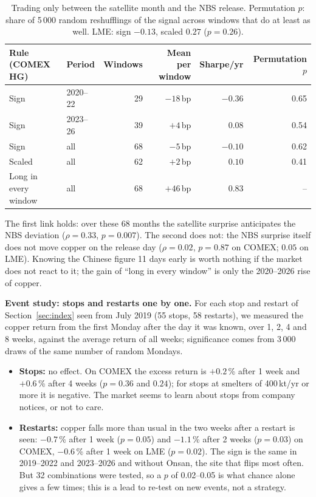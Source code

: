 \documentclass[10pt,a4paper]{article}
\begin{document}
\begin{table}[H]
\centering\small
\begin{tabular}{@{}l l r r r r@{}}
\toprule
\textbf{Rule (COMEX HG)} & \textbf{Period} & \textbf{Windows} & \textbf{Mean per window} & \textbf{Sharpe/yr} & \textbf{Permutation $p$}\\
\midrule
Sign    & 2020--22 & 29 & $-18$\,bp & $-0.36$ & 0.65\\
Sign    & 2023--26 & 39 & $+4$\,bp  & $0.08$  & 0.54\\
Sign    & all      & 68 & $-5$\,bp  & $-0.10$ & 0.62\\
Scaled  & all      & 62 & $+2$\,bp  & $0.10$  & 0.41\\
Long in every window & all & 68 & $+46$\,bp & $0.83$ & --\\
\bottomrule
\end{tabular}
\caption{Trading only between the satellite month and the NBS release. Permutation $p$: share of 5\,000 random reshufflings of the signal across windows that do at least as well. LME: sign $-0.13$, scaled $0.27$ ($p=0.26$).}
\label{tab:nbs}
\end{table}

The first link holds: over these 68 months the satellite surprise anticipates the NBS deviation ($\rho=0.33$, $p=0.007$). The second does not: the NBS surprise itself does not move copper on the release day ($\rho=0.02$, $p=0.87$ on COMEX; $0.05$ on LME). Knowing the Chinese figure 11 days early is worth nothing if the market does not react to it; the gain of ``long in every window'' is only the 2020--2026 rise of copper.

\textbf{Event study: stops and restarts one by one.} For each stop and restart of Section~\ref{sec:index} seen from July 2019 (55 stops, 58 restarts), we measured the copper return from the first Monday after the day it was known, over 1, 2, 4 and 8 weeks, against the average return of all weeks; significance comes from 3\,000 draws of the same number of random Mondays.
\begin{itemize}[leftmargin=1.2em]
  \item \textbf{Stops:} no effect. On COMEX the excess return is $+0.2$\,\% after 1 week and $+0.6$\,\% after 4 weeks ($p=0.36$ and $0.24$); for stops at smelters of 400\,kt/yr or more it is negative. The market seems to learn about stops from company notices, or not to care.
  \item \textbf{Restarts:} copper falls more than usual in the two weeks after a restart is seen: $-0.7$\,\% after 1 week ($p=0.05$) and $-1.1$\,\% after 2 weeks ($p=0.03$) on COMEX, $-0.6$\,\% after 1 week on LME ($p=0.02$). The sign is the same in 2019--2022 and 2023--2026 and without Onsan, the site that flips most often. But 32 combinations were tested, so a $p$ of 0.02--0.05 is what chance alone gives a few times; this is a lead to re-test on new events, not a strategy.
\end{itemize}
\end{document}
